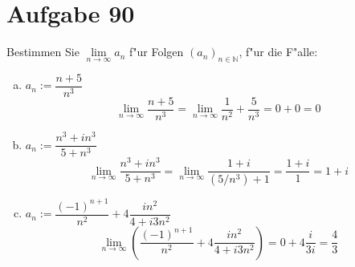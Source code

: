 \section{Aufgabe 90}
\setcounter{section}{90}

Bestimmen Sie $\lim\limits_{n\rightarrow\infty}a_n$ f"ur Folgen $(a_n)_{n \in
\mathbb{N}}$, f"ur die F"alle:
\begin{enumerate}[(a)]
    \item $a_n := \dfrac{n + 5}{n^3}$
        \begin{equation*}
            \lim\limits_{n\rightarrow\infty}\dfrac{n + 5}{n^3} = \lim\limits_{n\rightarrow\infty}\dfrac{1}{n^2} + \dfrac{5}{n^3} = 0 + 0 = 0
        \end{equation*}

    \item $a_n := \dfrac{n^3 + in^3}{5 + n^3}$
        \begin{equation*}
            \lim\limits_{n\rightarrow\infty}\dfrac{n^3 + in^3}{5 + n^3} = \lim\limits_{n\rightarrow\infty}\dfrac{1 + i}{(5/n^3) + 1} = \dfrac{1 + i}{1} = 1 + i
        \end{equation*}

    \item $a_n := \dfrac{(-1)^{n + 1}}{n^2} + 4\dfrac{in^2}{4 + i3n^2}$
        \begin{equation*}
            \lim\limits_{n\rightarrow\infty}\left(\dfrac{(-1)^{n + 1}}{n^2} + 4\dfrac{in^2}{4 + i3n^2}\right) = 0 + 4\dfrac{i}{3i} = \dfrac{4}{3}
        \end{equation*}
\end{enumerate}
